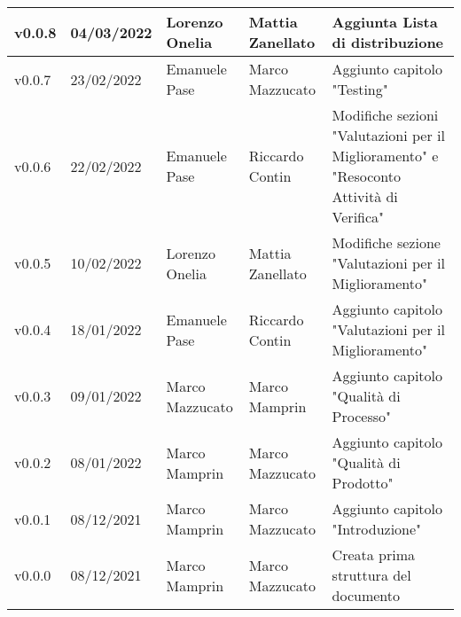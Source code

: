 {\begin{longtable}{|C{1.8cm}|C{2.1cm}|C{2cm}|C{2.4cm}|L{4.4cm}|}
  v0.0.8       & 04/03/2022    & Lorenzo Onelia  & Mattia Zanellato     & Aggiunta Lista di distribuzione                  \\ \hline
  v0.0.7        & 23/02/2022    & Emanuele Pase    & Marco Mazzucato   & Aggiunto capitolo "Testing"                           \\ \hline
  v0.0.6        & 22/02/2022    & Emanuele Pase     & Riccardo Contin    & Modifiche sezioni "Valutazioni per il Miglioramento" e "Resoconto Attività di Verifica" \\ \hline
  v0.0.5        & 10/02/2022    & Lorenzo Onelia    & Mattia Zanellato   & Modifiche sezione "Valutazioni per il Miglioramento"            \\ \hline
  v0.0.4        & 18/01/2022    & Emanuele Pase     & Riccardo Contin    & Aggiunto capitolo "Valutazioni per il Miglioramento"           \\ \hline
  v0.0.3        & 09/01/2022    & Marco Mazzucato   & Marco Mamprin      & Aggiunto capitolo "Qualità di Processo"                        \\ \hline
  v0.0.2        & 08/01/2022    & Marco Mamprin     & Marco Mazzucato    & Aggiunto capitolo "Qualità di Prodotto"                        \\ \hline
  v0.0.1        & 08/12/2021    & Marco Mamprin     & Marco Mazzucato    & Aggiunto capitolo "Introduzione"                               \\ \hline
  v0.0.0        & 08/12/2021    & Marco Mamprin     & Marco Mazzucato    & Creata prima struttura del documento                           \\ \hline
\end{longtable}}

\renewcommand\arraystretch{1}
